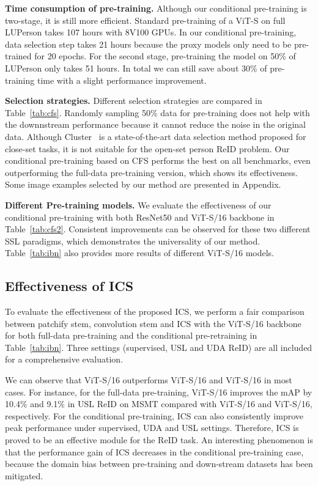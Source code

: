 \documentclass[10pt,twocolumn,letterpaper]{article}
\begin{document}
\noindent\textbf{Time consumption of pre-training.} Although our conditional pre-training is two-stage, it is still more efficient. Standard pre-training of a ViT-S on full LUPerson takes 107 hours with 8V100 GPUs. In our conditional pre-training, data selection step takes 21 hours because the proxy models only need to be pre-trained for 20 epochs. For the second stage, pre-training the model on 50\% of LUPerson only takes 51 hours. In total we can still save about 30\% of pre-training time with a slight performance improvement.

\noindent\textbf{Selection strategies.} Different selection strategies are compared in Table~\ref{tab:cfs}. Randomly sampling 50\% data for pre-training does not help with the downnstream performance because it cannot reduce the noise in the original data. Although Cluster~\cite{chakraborty2020efficient} is a state-of-the-art data selection method proposed for close-set tasks, it is not suitable for the open-set person ReID problem. Our conditional pre-training based on CFS performs  the best on all benchmarks, even outperforming the full-data pre-training version, which shows its effectiveness. Some image examples selected by our method are presented in Appendix.

\noindent\textbf{Different Pre-training models.} We evaluate the effectiveness of our conditional pre-training with both ResNet50 and ViT-S/16 backbone in Table~\ref{tab:cfs2}. Consistent improvements can be observed for these two different SSL paradigms, which demonstrates the universality of our method. Table~\ref{tab:ibn} also provides more results of different ViT-S/16 models. 

\subsection{Effectiveness of ICS}

To evaluate the effectiveness of the proposed ICS, we perform a fair comparison between patchify stem, convolution stem and ICS with the ViT-S/16 backbone for both full-data pre-training and the conditional pre-retraining in Table~\ref{tab:ibn}. Three settings (\eg supervised, USL and UDA ReID) are all included for a comprehensive evaluation.

We can observe that ViT-S/16 outperforms ViT-S/16 and ViT-S/16 in most cases. For instance, for the full-data pre-training, ViT-S/16 improves the mAP by 10.4\% and 9.1\% in USL ReID on MSMT compared with ViT-S/16 and ViT-S/16, respectively. For the conditional pre-training, ICS can also consistently improve peak performance under supervised, UDA and USL settings. Therefore, ICS is proved to be an effective module for the ReID task. An interesting phenomenon is that the performance gain of ICS decreases in the conditional pre-training case, because the domain bias between pre-training and down-stream datasets has been mitigated.
\end{document}
